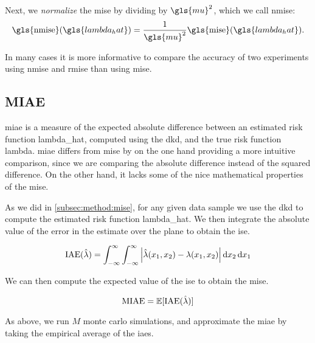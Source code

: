 Next, we \textit{normalize} the \gls{mise} by dividing by \(\gls{mu}^2\),
which we call \gls{nmise}:
\begin{equation}
\label{eq:nmise}
    \mbox{\gls{nmise}}(\gls{lambda_hat}) = 
        \frac{1}{\gls{mu}^2} \mbox{\gls{mise}}(\gls{lambda_hat}) \text{.}
\end{equation}

In many cases it is more informative to compare the accuracy of two experiments using \gls{nmise} and \gls{rmise} than using \gls{mise}.

\subsection{MIAE}
\label{subsec:method:miae}

\Gls{miae} is a measure of the expected absolute difference between an estimated risk function \gls{lambda_hat},
computed using the \gls{dkd}, and the true risk function \gls{lambda}.
\Gls{miae} differs from \gls{mise} by on the one hand providing a more intuitive comparison,
since we are comparing the absolute difference instead of the squared difference.
On the other hand, it lacks some of the nice mathematical properties of the \gls{mise}.

As we did in \autoref{subsec:method:mise}, for any given data sample we use the \gls{dkd} to compute the estimated risk function \gls{lambda_hat}.
We then integrate the absolute value of the error in the estimate over the plane to obtain the \gls{ise}.

\begin{equation}
    \mbox{IAE}(\hat{\lambda}) = 
        \int_{-\infty}^{\infty} \int_{-\infty}^{\infty}
            \left|
                \hat{\lambda}(x_1, x_2) - \lambda(x_1, x_2)
            \right| \mathop{}\!\mathrm{d}{x_2} \mathop{}\!\mathrm{d}{x_1}
\end{equation}

We can then compute the expected value of the \gls{ise} to obtain the \gls{mise}.

\begin{equation}
    \mbox{MIAE} = \mathbb{E} [\mbox{IAE}(\hat{\lambda})]
\end{equation}

As above, we run \(M\) monte carlo simulations,
and approximate the \gls{miae} by taking the empirical average of the \glspl{iae}.

